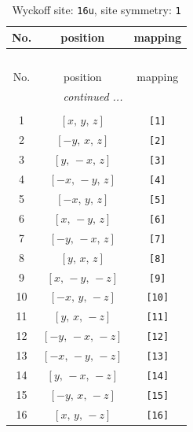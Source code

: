 \documentclass[fleqn,8pt]{jsarticle}
\begin{document}
\begin{longtable}{ccc}
\caption{Wyckoff site: {\tt 16u}, site symmetry: {\tt 1}}
 \\
 \hline \hline
No. & position & mapping \\ \hline \endfirsthead

\multicolumn{2}{l}{\tablename\ \thetable{}} \\
 \hline \hline
No. & position & mapping \\ \hline \endhead

 \hline \hline
\multicolumn{2}{r}{\footnotesize\it continued ...} \\ \endfoot

 \hline \hline
\multicolumn{2}{r}{} \\ \endlastfoot

1 & $\left[ x,\, y,\, z \right]$ & {\tt [1]} \\ \hline
2 & $\left[ - y,\, x,\, z \right]$ & {\tt [2]} \\ \hline
3 & $\left[ y,\, - x,\, z \right]$ & {\tt [3]} \\ \hline
4 & $\left[ - x,\, - y,\, z \right]$ & {\tt [4]} \\ \hline
5 & $\left[ - x,\, y,\, z \right]$ & {\tt [5]} \\ \hline
6 & $\left[ x,\, - y,\, z \right]$ & {\tt [6]} \\ \hline
7 & $\left[ - y,\, - x,\, z \right]$ & {\tt [7]} \\ \hline
8 & $\left[ y,\, x,\, z \right]$ & {\tt [8]} \\ \hline
9 & $\left[ x,\, - y,\, - z \right]$ & {\tt [9]} \\ \hline
10 & $\left[ - x,\, y,\, - z \right]$ & {\tt [10]} \\ \hline
11 & $\left[ y,\, x,\, - z \right]$ & {\tt [11]} \\ \hline
12 & $\left[ - y,\, - x,\, - z \right]$ & {\tt [12]} \\ \hline
13 & $\left[ - x,\, - y,\, - z \right]$ & {\tt [13]} \\ \hline
14 & $\left[ y,\, - x,\, - z \right]$ & {\tt [14]} \\ \hline
15 & $\left[ - y,\, x,\, - z \right]$ & {\tt [15]} \\ \hline
16 & $\left[ x,\, y,\, - z \right]$ & {\tt [16]} \\
\end{longtable}
\end{document}
